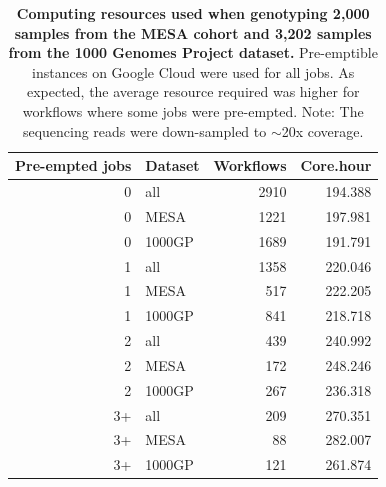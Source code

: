 \documentclass[11pt]{ucscthesis}
\begin{document}
\begin{table}[p]
  \centering
  \begin{tabular}[t]{|r|l|r|r|}
    \hline
    Pre-empted jobs & Dataset & Workflows & Core.hour \\
    \hline
    0               & all     & 2910      & 194.388   \\
    0               & MESA    & 1221      & 197.981   \\
    0               & 1000GP  & 1689      & 191.791   \\
    \hline
    1               & all     & 1358      & 220.046   \\
    1               & MESA    & 517       & 222.205   \\
    1               & 1000GP  & 841       & 218.718   \\
    \hline
    2               & all     & 439       & 240.992   \\
    2               & MESA    & 172       & 248.246   \\
    2               & 1000GP  & 267       & 236.318   \\
    \hline
    3+              & all     & 209       & 270.351   \\
    3+              & MESA    & 88        & 282.007   \\
    3+              & 1000GP  & 121       & 261.874   \\
    \hline
  \end{tabular}
  \caption[Computing resources used when genotyping 2,000 samples from the MESA cohort and 3,202 samples from the 1000 Genomes Project dataset]{{\bf Computing resources used when genotyping 2,000 samples from the MESA cohort and 3,202 samples from the 1000 Genomes Project dataset.}
    Pre-emptible instances on Google Cloud were used for all jobs.
    As expected, the average resource required was higher for workflows where some jobs were pre-empted.
    Note: The sequencing reads were down-sampled to $\sim$20x coverage.}
  \label{tab:svwdl-corehours}
\end{table}
\end{document}
